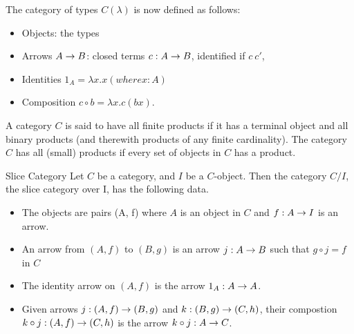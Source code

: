 \documentclass[../../notes.tex]{subfiles}
\begin{document}
The category of types $ C(\lambda ) $ is now defined as follows:
\begin{itemize}
\item Objects: the types
\item Arrows $A \rightarrow B$: closed terms $c: A \rightarrow B$, identified if $c ~ c'$,
\item Identities $1_A = \lambda x.x (where x : A) $
\item Composition $c \circ b = \lambda x.c(bx)$.
\end{itemize}

\begin{definition}
  A category $C$ is said to have all finite products if it has a terminal object
  and all binary products (and therewith products of any finite cardinality). The
  category $C$ has all (small) products if every set of objects in $C$ has a product.
\end{definition}

\begin{definition}{Slice Category}
  Let $C$ be a category, and $I$ be a $C$-object. Then the category $C / I$, the slice
  category over I, has the following data.
  \begin{itemize}
  \item The objects are pairs (A, f) where $A$ is an object in $C$ and $f: A \rightarrow I$ is
    an arrow.
  \item An arrow from $(A, f)$ to $(B, g)$ is an arrow $j: A \rightarrow B$ such that $g \circ j = f$ in $C$
  \item The identity arrow on $(A, f)$ is the arrow $1_A : A \rightarrow A$.
  \item Given arrows $j: (A, f) \rightarrow (B, g)$ and $ k: (B, g) \rightarrow (C, h) $, their compostion
    $k \circ j: (A, f) \rightarrow (C, h)$ is the arrow $k \circ j : A \rightarrow C$.
  \end{itemize}
\end{definition}
\end{document}
